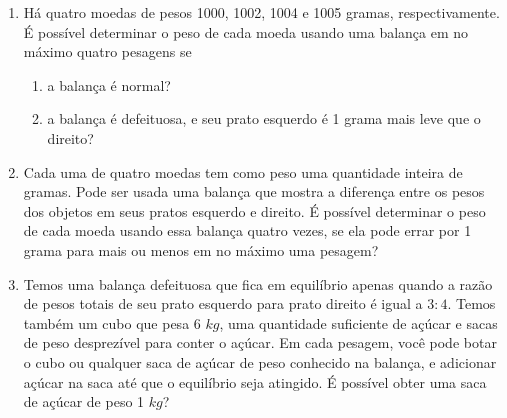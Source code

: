 \documentclass{article}
\begin{document}
\begin{enumerate}
    \item Há quatro moedas de pesos 1000, 1002, 1004 e 1005 gramas, respectivamente.
    É possível determinar o peso de cada moeda usando uma balança em no máximo quatro pesagens se
    
    \begin{enumerate}
    \item a balança é normal?
    
    \item a balança é defeituosa, e seu prato esquerdo é 1 grama mais leve que o direito?
    \end{enumerate}
    
    \item Cada uma de quatro moedas tem como peso uma quantidade inteira de gramas.
    Pode ser usada uma balança que mostra a diferença entre os pesos dos objetos em seus pratos esquerdo e direito.
    É possível determinar o peso de cada moeda usando essa balança quatro vezes, se ela pode errar por 1 grama para mais ou menos em no máximo uma pesagem?
    
    \item Temos uma balança defeituosa que fica em equilíbrio apenas quando a razão de pesos totais de seu prato esquerdo para prato direito é igual a $3:4$.
    Temos também um cubo que pesa 6 $kg$, uma quantidade suficiente de açúcar e sacas de peso desprezível para conter o açúcar.
    Em cada pesagem, você pode botar o cubo ou qualquer saca de açúcar de peso conhecido na balança, e adicionar açúcar na saca até que o equilíbrio seja atingido.
    É possível obter uma saca de açúcar de peso 1 $kg$?
\end{enumerate}
\end{document}

